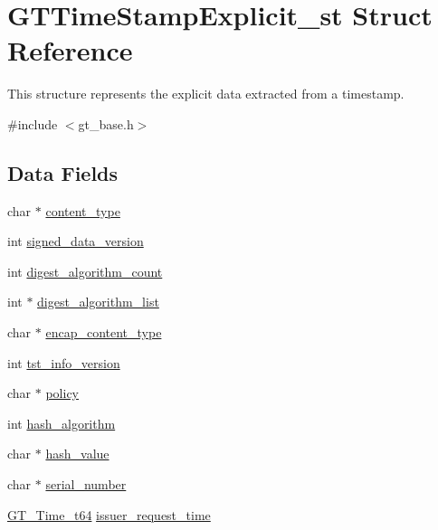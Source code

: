 \hypertarget{struct_g_t_time_stamp_explicit__st}{
\section{GTTimeStampExplicit\_\-st Struct Reference}
\label{struct_g_t_time_stamp_explicit__st}
}


This structure represents the explicit data extracted from a timestamp.  




{\ttfamily \#include $<$gt\_\-base.h$>$}

\subsection*{Data Fields}
\begin{DoxyCompactItemize}
\item 
char $\ast$ \hyperlink{struct_g_t_time_stamp_explicit__st_aa7221ac65d21a1dd1748eac4707113e7}{content\_\-type}
\item 
int \hyperlink{struct_g_t_time_stamp_explicit__st_a8ba3b09fd5244b24b57baa22381a794a}{signed\_\-data\_\-version}
\item 
int \hyperlink{struct_g_t_time_stamp_explicit__st_a0a2ec71de094aafb5cb8780fe05790cd}{digest\_\-algorithm\_\-count}
\item 
int $\ast$ \hyperlink{struct_g_t_time_stamp_explicit__st_ae8ac2ea7cf54746c5ec94c6bd9332276}{digest\_\-algorithm\_\-list}
\item 
char $\ast$ \hyperlink{struct_g_t_time_stamp_explicit__st_ac79a05fdadd73abab51336ae85191b52}{encap\_\-content\_\-type}
\item 
int \hyperlink{struct_g_t_time_stamp_explicit__st_ae5c2bd5eaa7753ba94c24c2327c9355f}{tst\_\-info\_\-version}
\item 
char $\ast$ \hyperlink{struct_g_t_time_stamp_explicit__st_a7313bed72669aba2ca9ddd192412ab16}{policy}
\item 
int \hyperlink{struct_g_t_time_stamp_explicit__st_a1bda18a06c71e3fe540d689e0dd1d7db}{hash\_\-algorithm}
\item 
char $\ast$ \hyperlink{struct_g_t_time_stamp_explicit__st_af9ddeae2cea40103299b75f9d5c32b82}{hash\_\-value}
\item 
char $\ast$ \hyperlink{struct_g_t_time_stamp_explicit__st_a32990948ebbc27a388028288f5bcfc1c}{serial\_\-number}
\item 
\hyperlink{group__common_ga4cc54826c21e0ed438d8e35be7039328}{GT\_\-Time\_\-t64} \hyperlink{struct_g_t_time_stamp_explicit__st_a35aa6d365a997b7d027dbe573c1c62f8}{issuer\_\-request\_\-time}

\end{DoxyCompactItemize}
